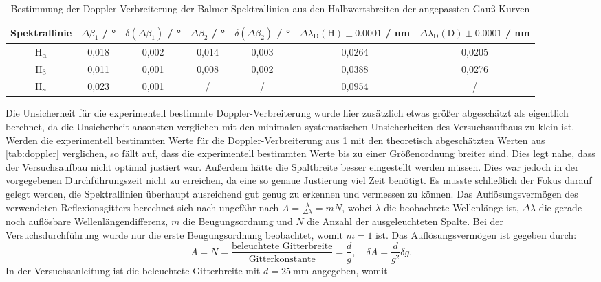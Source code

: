 \begin{table}[H]
    \centering
    \caption{Bestimmung der Doppler-Verbreiterung der Balmer-Spektrallinien aus den Halbwertsbreiten der angepassten Gauß-Kurven}
    \begin{tabular}{c|c|c|c|c|c|c}
        Spektrallinie & $\Delta \beta_1$ / \unit{\degree} & $\delta (\Delta \beta_1)$ / \unit{\degree} & $\Delta \beta_2$ / \unit{\degree} & $\delta (\Delta \beta_2)$ / \unit{\degree} & $\Delta \lambda_{\mathrm{D}}(\mathrm{H}) \pm \num{0,0001}$ / \unit{\nano \meter} & $\Delta \lambda_{\mathrm{D}}(\mathrm{D}) \pm \num{0,0001}$ / \unit{\nano \meter} \\
        \hline
        $\mathrm{H_{\alpha}}$ & 0,018 & 0,002 & 0,014 & 0,003 & 0,0264 & 0,0205 \\
        $\mathrm{H_{\beta}}$ & 0,011 & 0,001 & 0,008 & 0,002 & 0,0388 & 0,0276 \\
        $\mathrm{H_{\gamma}}$ & 0,023 & 0,001 & / & / & 0,0954 & /
    \end{tabular}\label{tab:doppler2}
\end{table} Die Unsicherheit für die experimentell bestimmte Doppler-Verbreiterung wurde hier zusätzlich etwas größer abgeschätzt als eigentlich berchnet, da die Unsicherheit ansonsten verglichen
mit den minimalen systematischen Unsicherheiten des Versuchsaufbaus zu klein ist. Werden die experimentell bestimmten Werte für die Doppler-Verbreiterung
aus \cref{tab:doppler2} mit den theoretisch abgeschätzten Werten aus \cref{tab:doppler} verglichen, so fällt auf, dass die experimentell bestimmten Werte
bis zu einer Größenordnung breiter sind. Dies legt nahe, dass der Versuchsaufbau nicht optimal justiert war. Außerdem hätte die Spaltbreite
besser eingestellt werden müssen. Dies war jedoch in der vorgegebenen Durchführungszeit nicht zu erreichen, da eine so genaue Justierung viel Zeit benötigt.
Es musste schließlich der Fokus darauf gelegt werden, die Spektrallinien überhaupt ausreichend gut genug zu erkennen und vermessen zu können.\newline
\indent Das Auflösungsvermögen des verwendeten Reflexionsgitters berechnet sich nach \cite{Demtröder:829122} ungefähr nach $A = \frac{\lambda}{\Delta \lambda} = m N$,
wobei $\lambda$ die beobachtete Wellenlänge ist, $\Delta \lambda$ die gerade noch auflösbare Wellenlängendifferenz, $m$ die Beugungsordnung und $N$ die Anzahl
der ausgeleuchteten Spalte. Bei der Versuchsdurchführung wurde nur die erste Beugungsordnung beobachtet, womit $m=1$ ist. Das Auflösungsvermögen ist gegeben durch:
\begin{equation*}
    A = N = \frac{\text{beleuchtete Gitterbreite}}{\text{Gitterkonstante}} = \frac{d}{g}, \quad \delta A = \frac{d}{g^2} \delta g .
\end{equation*} In der Versuchsanleitung \cite{skript} ist die beleuchtete Gitterbreite mit $d = \SI{25}{\milli \meter}$ angegeben, womit
